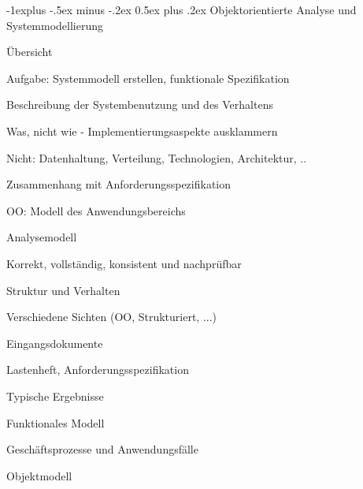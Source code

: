 \documentclass[a4paper]{article}
\makeatletter
\renewcommand{\subsection}{\@startsection{subsection}{2}{0mm}%
                                {-1explus -.5ex minus -.2ex}%
                                {0.5ex plus .2ex}%
                                {\normalfont\normalsize\bfseries}}
\makeatother
\begin{document}
\begin{multicols}{3}
  \subsection{Objektorientierte Analyse und Systemmodellierung}
  \begin{itemize*}
    \item Übersicht
          \begin{itemize*}
            \item Aufgabe: Systemmodell erstellen, funktionale Spezifikation
            \item Beschreibung der Systembenutzung und des Verhaltens
            \item Was, nicht wie - Implementierungsaspekte ausklammern
                  \begin{itemize*}
                    \item Nicht: Datenhaltung, Verteilung, Technologien, Architektur, ..
                  \end{itemize*}
            \item Zusammenhang mit Anforderungsspezifikation
            \item OO: Modell des Anwendungsbereichs
          \end{itemize*}
    \item Analysemodell
          \begin{itemize*}
            \item Korrekt, vollständig, konsistent und nachprüfbar
            \item Struktur und Verhalten
            \item Verschiedene Sichten (OO, Strukturiert, ...)
          \end{itemize*}
    \item Eingangsdokumente
          \begin{itemize*}
            \item Lastenheft, Anforderungsspezifikation
          \end{itemize*}
    \item Typische Ergebnisse
          \begin{itemize*}
            \item Funktionales Modell
                  \begin{itemize*}
                    \item Geschäftsprozesse und Anwendungsfälle
                  \end{itemize*}
            \item Objektmodell

\end{itemize*}
\end{itemize*}
\end{multicols}
\end{document}
